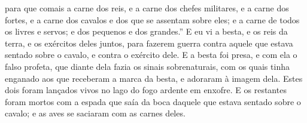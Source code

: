 {  para que comais a carne dos reis, e a carne dos chefes militares, e a carne dos fortes, e a carne dos cavalos e dos que se assentam sobre eles; e a carne de todos os livres e servos; e dos pequenos e dos grandes.”
  E eu vi a besta, e os reis da terra, e os exércitos deles juntos, para fazerem guerra contra aquele que estava sentado sobre o cavalo, e contra o exército dele.
  E a besta foi presa, e com ela o falso profeta, que diante dela fazia os sinais sobrenaturais, com os quais tinha enganado aos que receberam a marca da besta, e adoraram à imagem dela. Estes dois foram lançados vivos no lago do fogo ardente em enxofre.
  E os restantes foram mortos com a espada que saía da boca daquele que estava sentado sobre o cavalo; e as aves se saciaram com as carnes deles.
\par }

